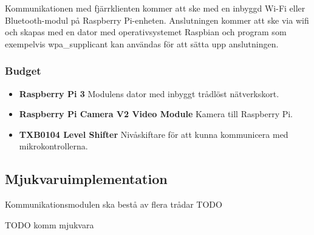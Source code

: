 \documentclass[designspec/spec.tex]{subfiles}
\begin{document}
Kommunikationen med fjärrklienten kommer att ske med en inbyggd Wi-Fi eller
Bluetooth-modul på Raspberry Pi-enheten. Anslutningen kommer att ske via wifi
och skapas med en dator med operativsystemet Raspbian och program som
exempelvis wpa\_supplicant kan användas för att sätta upp anslutningen.

\subsubsection{Budget}
\begin{itemize}
    \item \textbf{Raspberry Pi 3} Modulens dator med inbyggt trådlöst
    nätverkskort.
    \item \textbf{Raspberry Pi Camera V2 Video Module} Kamera till Raspberry
    Pi.
    \item \textbf{TXB0104 Level Shifter} Nivåskiftare för att kunna kommunicera
    med mikrokontrollerna.
\end{itemize}

\subsection{Mjukvaruimplementation}
Kommunikationsmodulen ska bestå av flera trådar TODO

TODO komm mjukvara
\end{document}
